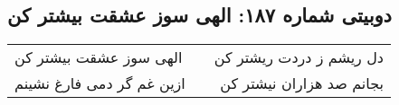 \begin{center}
\section*{دوبیتی شماره ۱۸۷: الهی سوز عشقت بیشتر کن}
\label{sec:187}
\begin{longtable}{l p{0.5cm} r}
الهی سوز عشقت بیشتر کن
&&
دل ریشم ز دردت ریشتر کن
\\
ازین غم گر دمی فارغ نشینم
&&
بجانم صد هزاران نیشتر کن
\\
\end{longtable}
\end{center}

